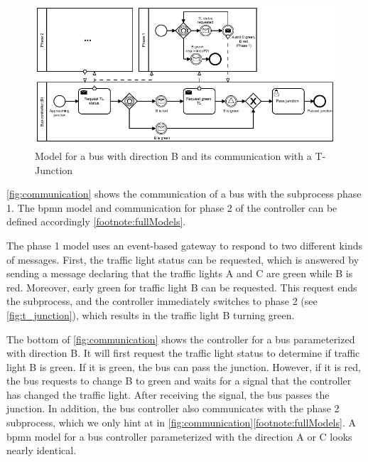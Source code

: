 \documentclass{jot}
\begin{document}
\begin{figure}[ht]
    \centering
    \includegraphics[width=1\textwidth]{figures/communication.pdf}
    \caption{Model for a bus with direction B and its communication with a T-Junction}
    \label{fig:communication}
\end{figure}

\autoref{fig:communication} shows the communication of a bus with the subprocess phase 1.
The \gls*{bpmn} model and communication for phase 2 of the controller can be defined accordingly \cref{footnote:fullModels}.

The phase 1 model uses an event-based gateway to respond to two different kinds of messages.
First, the traffic light status can be requested, which is answered by sending a message declaring that the traffic lights A and C are green while B is red.
Moreover, early green for traffic light B  can be requested.
This request ends the subprocess, and the controller immediately switches to phase 2 (see \autoref{fig:t_junction}), which results in the traffic light B turning green.

The bottom of \autoref{fig:communication} shows the controller for a bus parameterized with direction B.
It will first request the traffic light status to determine if traffic light B is green.
If it is green, the bus can pass the junction.
However, if it is red, the bus requests to change B to green and waits for a signal that the controller has changed the traffic light.
After receiving the signal, the bus passes the junction.
In addition, the bus controller also communicates with the phase 2 subprocess, which we only hint at in \autoref{fig:communication}\cref{footnote:fullModels}.
A \gls*{bpmn} model for a bus controller parameterized with the direction A or C looks nearly identical.
\end{document}
